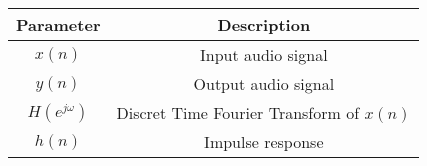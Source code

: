 
\begin{tabular}{|c|c|}
\hline
\textbf{Parameter} & \textbf{Description}\\
\hline 
$x(n)$ & Input audio signal \\
\hline
$y(n)$ & Output audio signal\\
\hline
$H(e^{j\omega})$& Discret Time Fourier Transform of
$x(n)$\\
\hline
$h(n) $& Impulse response \\
\hline
\end{tabular}


